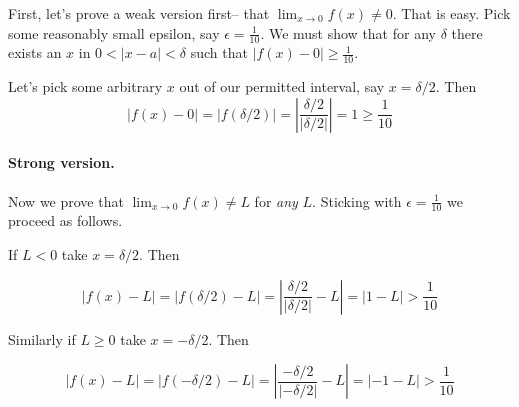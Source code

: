 First, let's prove a weak version first-- that
$\lim_{x\to 0}f(x)\neq 0$. That is easy. Pick some reasonably small
epsilon, say $\epsilon=\frac{1}{10}$. We must show that for any
$\delta$ there exists an $x$ in $0<|x-a|<\delta$ such that
$|f(x)-0|\geq \frac{1}{10}$.

\vs

Let's pick some arbitrary $x$ out of our permitted interval, say $x=\delta/2$. Then
\[|f(x)-0|=|f(\delta/2)|=\left|\frac{\delta/2}{|\delta/2|}\right|=1\geq\frac{1}{10}\]


\paragraph{Strong version.}

Now we prove that $\lim_{x\to 0}f(x)\neq L$ for \textit{any} $L$. Sticking
with $\epsilon=\frac{1}{10}$ we proceed as follows.

\vs

If $L<0$ take $x=\delta/2$. Then

\[|f(x)-L|=|f(\delta/2)-L|=\left|\frac{\delta/2}{|\delta/2|}-L\right|=|1-L|>\frac{1}{10}\]

Similarly if $L\geq 0$ take $x=-\delta/2$. Then

\[|f(x)-L|=|f(-\delta/2)-L|=\left|\frac{-\delta/2}{|-\delta/2|}-L\right|=|-1-L|>\frac{1}{10}\]

